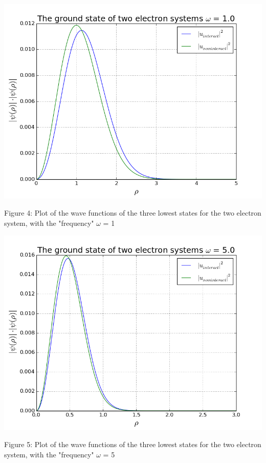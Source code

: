 \documentclass[norsk,a4paper,12pt]{article}
\begin{document}
\includegraphics[scale=0.65]{wavefunc_two_omega=1}\par
\vspace{1mm}
Figure 4: Plot of the wave functions of the three lowest states for the two electron  system, with the "frequency" $\omega$ = 1
\par
\vspace{7mm}

\includegraphics[scale=0.6]{wavefunc_two_omega=5}\par
\vspace{1mm}
Figure 5: Plot of the wave functions of the three lowest states for the two electron  system, with the "frequency" $\omega$ = 5
\par
\vspace{7mm}
\end{document}

